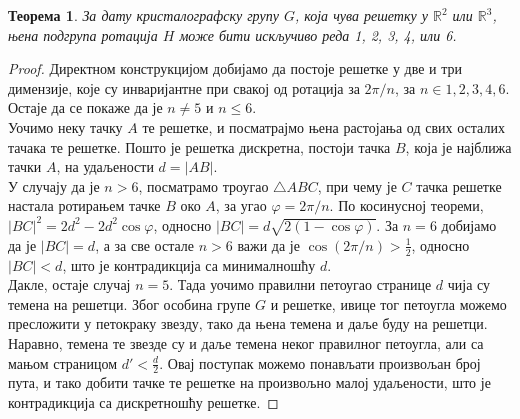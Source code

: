 \documentclass{report}
\theoremstyle{plain}
\newtheorem{thm}{Теорема}
\theoremstyle{definition}
\begin{document}
\begin{thm}
За дату кристалографску групу $G$, која чува решетку у $\mathbb{R}^2$ или $\mathbb{R}^3$, њена подгрупа ротација $H$ може бити искључиво реда 1, 2, 3, 4, или 6.
\end{thm}
\begin{proof}
Директном конструкцијом добијамо да постоје решетке у две и три димензије, које су инваријантне при свакој од ротација за $2\pi/n$, за $n\in{1, 2, 3, 4, 6}$. Остаје да се покаже да је $n\neq 5$ и $n\leq 6$.\\
Уочимо неку тачку $A$ те решетке, и посматрајмо њена растојања од свих осталих тачака те решетке. Пошто је решетка дискретна, постоји тачка $B$, која је најближа тачки $A$, на удаљености $d = |AB|$.\\
У случају да је $n>6$, посматрамо троугао $\triangle ABC$, при чему је $C$ тачка решетке настала ротирањем тачке $B$ око $A$, за угао $\varphi = 2\pi/n$. По косинусној теореми, $|BC|^2 = 2 d^2-2 d^2 \cos\varphi$, односно $|BC| = d\sqrt{2(1-\cos\varphi)}$. За $n=6$ добијамо да је $|BC| = d$, а за све остале $n>6$ важи да је $\cos(2\pi/n)>\frac12$, односно $|BC|<d$, што је контрадикција са минималношћу $d$.\\
Дакле, остаје случај $n=5$. Тада уочимо правилни петоугао странице $d$ чија су темена на решетци. Због особина групе $G$ и решетке, ивице тог петоугла можемо пресложити у петокраку звезду, тако да њена темена и даље буду на решетци. Наравно, темена те звезде су и даље темена неког правилног петоугла, али са мањом страницом $d'<\frac d 2$. Овај поступак можемо понављати произвољан број пута, и тако добити тачке те решетке на произвољно малој удаљености, што је контрадикција са дискретношћу решетке.
\end{proof}
\end{document}
